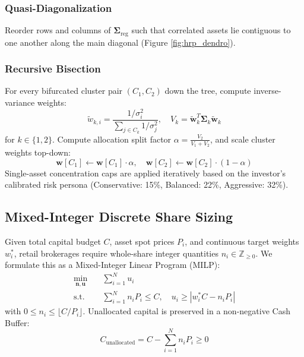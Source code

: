 \documentclass[conference]{IEEEtran}
\begin{document}
\subsubsection{Quasi-Diagonalization} Reorder rows and columns of $\boldsymbol{\Sigma}_{\text{reg}}$ such that correlated assets lie contiguous to one another along the main diagonal (Figure \ref{fig:hrp_dendro}).
\subsubsection{Recursive Bisection} For every bifurcated cluster pair $(C_1, C_2)$ down the tree, compute inverse-variance weights:
\begin{equation}
\tilde{w}_{k, i} = \frac{1/\sigma_i^2}{\sum_{j \in C_k} 1/\sigma_j^2}, \quad V_k = \tilde{\mathbf{w}}_k^T \boldsymbol{\Sigma}_k \tilde{\mathbf{w}}_k
\end{equation}
for $k \in \{1, 2\}$. Compute allocation split factor $\alpha = \frac{V_2}{V_1 + V_2}$, and scale cluster weights top-down:
\begin{equation}
\mathbf{w}[C_1] \leftarrow \mathbf{w}[C_1] \cdot \alpha, \quad \mathbf{w}[C_2] \leftarrow \mathbf{w}[C_2] \cdot (1 - \alpha)
\end{equation}
Single-asset concentration caps are applied iteratively based on the investor's calibrated risk persona (Conservative: 15\%, Balanced: 22\%, Aggressive: 32\%).

\subsection{Mixed-Integer Discrete Share Sizing}
Given total capital budget $C$, asset spot prices $P_i$, and continuous target weights $w_i^*$, retail brokerages require whole-share integer quantities $n_i \in \mathbb{Z}_{\ge 0}$. We formulate this as a Mixed-Integer Linear Program (MILP):
\begin{align}
\min_{\mathbf{n}, \mathbf{u}} \quad & \sum_{i=1}^N u_i \\
\text{s.t.} \quad & \sum_{i=1}^N n_i P_i \le C, \quad u_i \ge |w_i^* C - n_i P_i| \nonumber
\end{align}
with $0 \le n_i \le \lfloor C / P_i \rfloor$. Unallocated capital is preserved in a non-negative Cash Buffer:
\begin{equation}
C_{\text{unallocated}} = C - \sum_{i=1}^N n_i P_i \ge 0
\end{equation}
\end{document}
